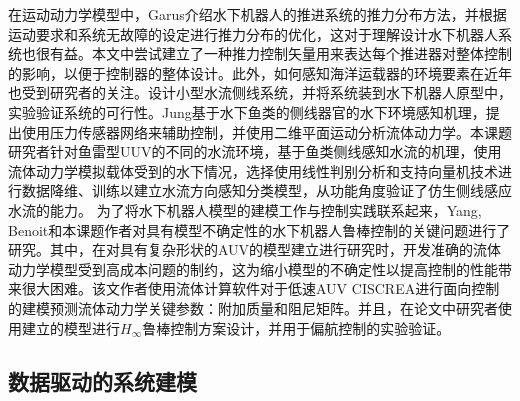 在运动动力学模型中，Garus\cite{garus2014thrust}介绍水下机器人的推进系统的推力分布方法，并根据运动要求和系统无故障的设定进行推力分布的优化，这对于理解设计水下机器人系统也很有益。本文中尝试建立了一种推力控制矢量用来表达每个推进器对整体控制的影响，以便于控制器的整体设计。此外，如何感知海洋运载器的环境要素在近年也受到研究者的关注\cite{muhammad2015flow,bouffanais2010hydrodynamic,tagliaferri2015wind}。设计小型水流侧线系统，并将系统装到水下机器人原型中，实验验证系统的可行性\cite{franosch2010biomimetic,abdulsadda2012artificial,yang2010artificial}。Jung\cite{jung2013flow}基于水下鱼类的侧线器官的水下环境感知机理，提出使用压力传感器网络来辅助控制，并使用二维平面运动分析流体动力学。本课题研究者针对鱼雷型UUV的不同的水流环境，基于鱼类侧线感知水流的机理，使用流体动力学模拟载体受到的水下情况，选择使用线性判别分析和支持向量机技术进行数据降维、训练以建立水流方向感知分类模型，从功能角度验证了仿生侧线感应水流的能力\cite{Wu2016lateralline,friedman2001elements}。
为了将水下机器人模型的建模工作与控制实践联系起来，Yang, Benoit和本课题作者对具有模型不确定性的水下机器人鲁棒控制的关键问题进行了研究\cite{yang2014modeling}。其中，在对具有复杂形状的AUV的模型建立进行研究时，开发准确的流体动力学模型受到高成本问题的制约，这为缩小模型的不确定性以提高控制的性能带来很大困难。该文作者使用流体计算软件对于低速AUV CISCREA进行面向控制的建模预测流体动力学关键参数：附加质量和阻尼矩阵\cite{yang2014modeling,yang2015modeling}。并且，在论文中研究者使用建立的模型进行$H_{\infty}$鲁棒控制方案设计，并用于偏航控制的实验验证\cite{yang2015modeling,yang2015robust,du2016robust}。


\subsection{数据驱动的系统建模 }

